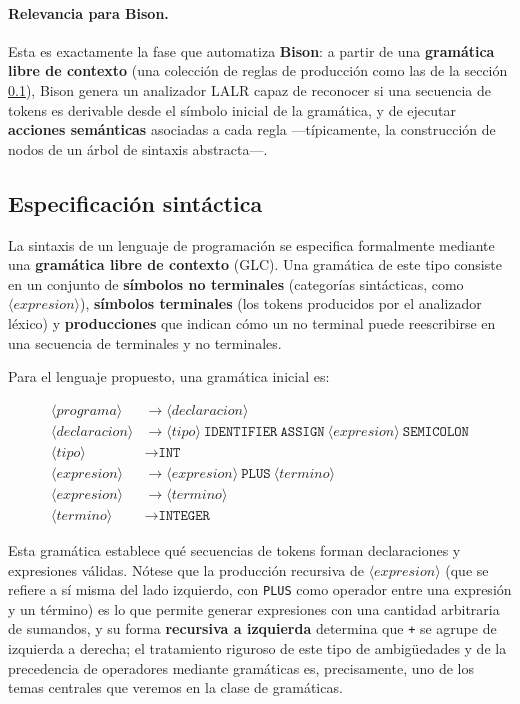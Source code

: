 \documentclass[11pt,a4paper]{article}
\begin{document}
\paragraph{Relevancia para Bison.} Esta es exactamente la fase que automatiza \textbf{Bison}: a
partir de una \textbf{gramática libre de contexto} (una colección de reglas de producción como
las de la sección \ref{sec:especificacion-sintactica}), Bison genera un analizador LALR capaz
de reconocer si una secuencia de tokens es derivable desde el símbolo inicial de la gramática,
y de ejecutar \textbf{acciones semánticas} asociadas a cada regla —típicamente, la construcción
de nodos de un árbol de sintaxis abstracta—.

\subsection{Especificación sintáctica}
\label{sec:especificacion-sintactica}

La sintaxis de un lenguaje de programación se especifica formalmente mediante una
\textbf{gramática libre de contexto} (GLC). Una gramática de este tipo consiste en un conjunto
de \textbf{símbolos no terminales} (categorías sintácticas, como $\langle expresion \rangle$),
\textbf{símbolos terminales} (los tokens producidos por el analizador léxico) y
\textbf{producciones} que indican cómo un no terminal puede reescribirse en una secuencia de
terminales y no terminales.

Para el lenguaje propuesto, una gramática inicial es:

\begin{align*}
\langle programa \rangle
    &\rightarrow \langle declaracion \rangle \\[4pt]
\langle declaracion \rangle
    &\rightarrow
    \langle tipo \rangle
    \ \texttt{IDENTIFIER}
    \ \texttt{ASSIGN}
    \ \langle expresion \rangle
    \ \texttt{SEMICOLON} \\[4pt]
\langle tipo \rangle
    &\rightarrow \texttt{INT} \\[4pt]
\langle expresion \rangle
    &\rightarrow
    \langle expresion \rangle
    \ \texttt{PLUS}
    \ \langle termino \rangle \\[4pt]
\langle expresion \rangle
    &\rightarrow \langle termino \rangle \\[4pt]
\langle termino \rangle
    &\rightarrow \texttt{INTEGER}
\end{align*}

Esta gramática establece qué secuencias de tokens forman declaraciones y expresiones válidas.
Nótese que la producción recursiva de $\langle expresion \rangle$ (que se refiere a sí misma
del lado izquierdo, con \texttt{PLUS} como operador entre una expresión y un término) es lo que
permite generar expresiones con una cantidad arbitraria de sumandos, y su forma
\textbf{recursiva a izquierda} determina que \texttt{+} se agrupe de izquierda a derecha; el
tratamiento riguroso de este tipo de ambigüedades y de la precedencia de operadores mediante
gramáticas es, precisamente, uno de los temas centrales que veremos en la clase de gramáticas.
\end{document}
